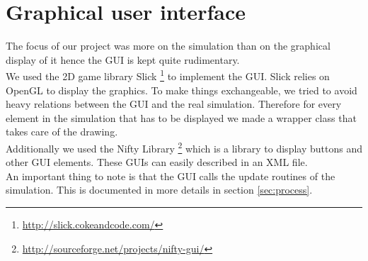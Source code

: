 
\section{Graphical user interface}
\label{sec:gui}

The focus of our project was more on the simulation than on the graphical 
display of it hence the GUI is kept quite rudimentary. \\

\noindent We used the 2D game library Slick 
\footnote{\href{http://slick.cokeandcode.com/}{http://slick.cokeandcode.com/}}
to implement the GUI. Slick relies on OpenGL to display the graphics.
To make things exchangeable, we tried to avoid heavy
relations between the GUI and the real simulation. Therefore for every 
element in the simulation that has to be displayed we made a wrapper class
that takes care of the drawing. \\

\noindent Additionally we used the Nifty Library 
\footnote{\href{http://sourceforge.net/projects/nifty-gui/}
{http://sourceforge.net/projects/nifty-gui/}} which is a library to display
buttons and other GUI elements. These GUIs can easily described in an XML file. \\

An important thing to note is that the GUI calls the update routines of the
simulation. This is documented in more details in section \ref{sec:process}.

